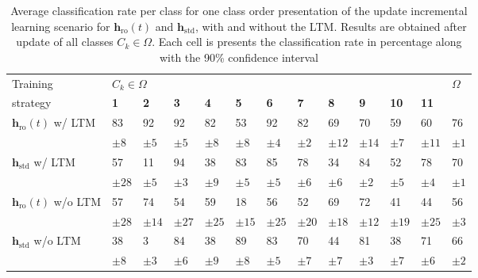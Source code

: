 \begin{table*}[tb]
  \small
  \centering
  \caption{Average classification rate per class for one class order presentation of the update incremental learning scenario for $\textbf{h}_\text{ro}(t)$ and $\textbf{h}_\text{std}$, with and without the LTM. Results are obtained after update of all classes $C_k\in\Omega$. Each cell is presents the classification rate in percentage along with the 90\% confidence interval}
  \footnotesize{
  \begin{tabular}{|l|lllllllllll|l|} \hline
    Training &\multicolumn{11}{l|}{$C_k \in \Omega$} &\multirow{2}{*}{$\Omega$}
    \\ \cline{2-12}
    strategy &{\bf 1} &{\bf 2} &{\bf 3}  &{\bf 4}  &{\bf 5} & 
    {\bf 6} &{\bf 7} &{\bf 8} &{\bf 9} &{\bf 10} &{\bf 11} &
    \\ \hline \hline
		\multirow{2}{*}{$\textbf{h}_\text{ro}(t)$ w/ LTM}
		& 83 & 92 & 92 & 82 & 53 & 92 & 82 & 69 & 70 & 59 & 60 & 76
		\\ 
		& $\pm 8$ & $\pm 5$ & $\pm 5$ & $\pm 8$ & $\pm 8$ & $\pm 4$ & $\pm 2$
		& $\pm 12$ & $\pm 14$ & $\pm 7$ & $\pm 11$ & $\pm 1$
		\\ \hline 
		\multirow{2}{*}{$\textbf{h}_\text{std}$ w/ LTM} 
		& 57 & 11 & 94 & 38 & 83 & 85 & 78 & 34 & 84 & 52 & 78 & 70
		\\ 
		& $\pm 28$ & $\pm 5$ & $\pm 3$ & $\pm 9$ & $\pm 5$ & $\pm 5$ & $\pm 6$
		& $\pm 6$ & $\pm 2$ & $\pm 5$ & $\pm 4$ & $\pm 1$
		\\ \hline \hline
		\multirow{2}{*}{$\textbf{h}_\text{ro}(t)$ w/o LTM}
		& 57 & 74 & 54 & 59 & 18 & 56 & 52 & 69 & 72 & 41 & 44 & 56
		\\ 
		& $\pm 28$ & $\pm 14$ & $\pm 27$ & $\pm 25$ & $\pm 15$ & $\pm 25$ 
		& $\pm 20$ & $\pm 18$ & $\pm 12$ & $\pm 19$ & $\pm 25$ & $\pm 3$
		\\ \hline 
		\multirow{2}{*}{$\textbf{h}_\text{std}$ w/o LTM} 
		& 38 & 3 & 84 & 38 & 89 & 83 & 70 & 44 & 81 & 38 & 71 & 66
		\\ 
		& $\pm 8$ & $\pm 3$ & $\pm 6$ & $\pm 9$ & $\pm 8$ & $\pm 5$ & $\pm 7$
		& $\pm 7$ & $\pm 3$ & $\pm 7$ & $\pm 6$ & $\pm 2$
		\\ \hline 
	
	\end{tabular} }
	\label{tab:c1_RefExt}
\end{table*}

